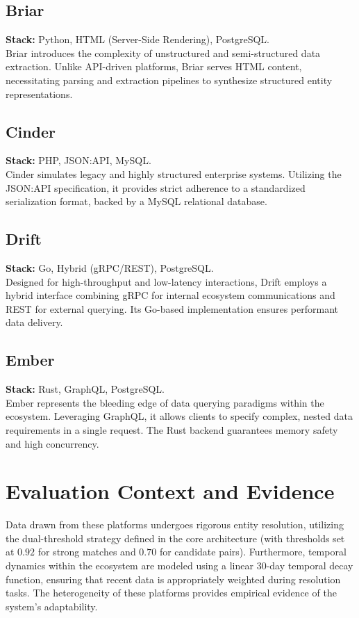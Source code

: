 \subsection{Briar}
\textbf{Stack:} Python, HTML (Server-Side Rendering), PostgreSQL. \\
Briar introduces the complexity of unstructured and semi-structured data extraction. Unlike API-driven platforms, Briar serves HTML content, necessitating parsing and extraction pipelines to synthesize structured entity representations.

\subsection{Cinder}
\textbf{Stack:} PHP, JSON:API, MySQL. \\
Cinder simulates legacy and highly structured enterprise systems. Utilizing the JSON:API specification, it provides strict adherence to a standardized serialization format, backed by a MySQL relational database.

\subsection{Drift}
\textbf{Stack:} Go, Hybrid (gRPC/REST), PostgreSQL. \\
Designed for high-throughput and low-latency interactions, Drift employs a hybrid interface combining gRPC for internal ecosystem communications and REST for external querying. Its Go-based implementation ensures performant data delivery.

\subsection{Ember}
\textbf{Stack:} Rust, GraphQL, PostgreSQL. \\
Ember represents the bleeding edge of data querying paradigms within the ecosystem. Leveraging GraphQL, it allows clients to specify complex, nested data requirements in a single request. The Rust backend guarantees memory safety and high concurrency.

\section{Evaluation Context and Evidence}
Data drawn from these platforms undergoes rigorous entity resolution, utilizing the dual-threshold strategy defined in the core architecture (with thresholds set at $0.92$ for strong matches and $0.70$ for candidate pairs). Furthermore, temporal dynamics within the ecosystem are modeled using a linear 30-day temporal decay function, ensuring that recent data is appropriately weighted during resolution tasks. The heterogeneity of these platforms provides empirical evidence of the system's adaptability.

